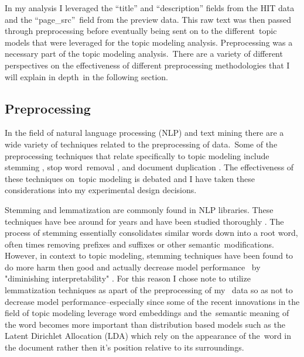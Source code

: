 \documentclass[letterpaper,12pt]{article}
\begin{document}
In my analysis I leveraged the ``title'' and ``description'' fields from the HIT data and the ``page\_src''\
field from the preview data. This raw text was then passed through preprocessing before eventually being sent on to the different\
topic models that were leveraged for the topic modeling analysis. Preprocessing was a necessary part of the topic modeling analysis.\
There are a variety of different perspectives on the effectiveness of different preprocessing methodologies that I will explain in depth\
in the following section.

\subsection{Preprocessing}
In the field of natural language processing (NLP) and text mining there are a wide variety of techniques related to the preprocessing of data.\
Some of the preprocessing techniques that relate specifically to topic modeling include stemming \cite{lovins1968development}, stop word\
removal \cite{silva2003importance}, and document duplication \cite{bouayad1999duplication}. The effectiveness of these techniques on\
topic modeling is debated and I have taken these considerations into my experimental design decisions.

Stemming and lemmatization are commonly found in NLP libraries. These techniques have bee around for years and have been studied thoroughly \cite{lovins1968development, kanis2010comparison, jivani2011comparative, larkey2002improving}.
The process of stemming essentially consolidates similar words down into a root word, often times removing prefixes and suffixes or other semantic\
modifications. However, in context to topic modeling, stemming techniques have been found to do more harm then good and actually decrease model performance \cite{schofieldunderstanding} \
by "diminishing interpretability" \cite{boyd2014care}. For this reason I chose note to utilize lemmatization techniques as apart of the preprocessing of my \
data so as not to decrease model performance--especially since some of the recent innovations in the field of topic modeling leverage word embeddings \cite{mikolov2013distributed} and the\
semantic meaning of the word becomes more important than distribution based models such as the Latent Dirichlet Allocation (LDA) \cite{blei2003latent} which rely on the appearance of the\
word in the document rather then it's position relative to its surroundings.
\end{document}
